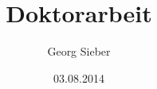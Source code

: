 \newcommand\titlerule[1][1pt]{\rule{\textwidth}{#1}}
\renewcommand*{\chapterformat}{%
  \parbox{\textwidth}{\Large\hfill\MakeUppercase{\chapappifchapterprefix{\,}} \Huge\thechapter\enskip}}
  \renewcommand\chapterlineswithprefixformat[3]{%
    #2\nobreak%
    \ifstr{#2}{}{}{\vspace*{-\dp\strutbox}}%
    \titlerule\par\vspace{2ex}\nobreak%
    {\LARGE\centering#3}%
    \vspace{2ex}\nobreak\titlerule\vspace{1ex}%
  }



\usepackage{scrhack}



\title{Doktorarbeit}
\author{Georg Sieber}
\date{03.08.2014}
